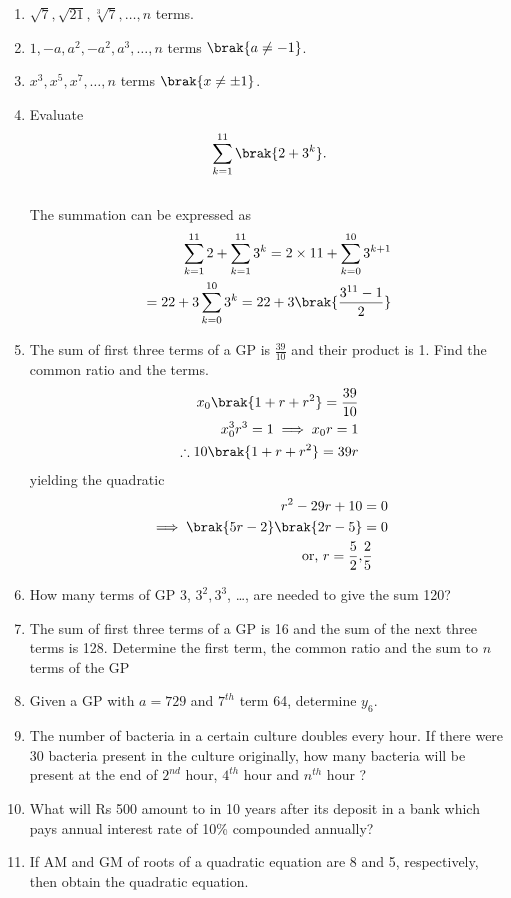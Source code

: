 \begin{enumerate}[label=\thesubsection.\arabic*.,ref=\thesubsection.\theenumi]
\item $\sqrt{7}, \sqrt{21}, \sqrt[3]{7}, \dots,  n$ terms.
\item $1, -a, a^2, -a^2, a^3,\dots,  n$ terms $\brak{a \neq -1}$.
\item $x^3, x^5, x^7,\dots,  n$ terms $\brak{x \neq \pm 1}$.
\item Evaluate $$\sum _{k=1}^{11} \brak{2 + 3^k}.$$
	\\
	\solution  The summation can be expressed as
\begin{align}
\sum _{k=1}^{11} 2 +\sum _{k=1}^{11} 3^k
	=2\times 11 +\sum _{k=0}^{10} 3^{k+1}
	\\
	=22+3\sum _{k=0}^{10} 3^{k}=22+3\brak{\frac{3^{11}-1}{2}}
\end{align}
\item The sum of first three terms of a GP  is $\frac{39}{10}$ and their product is 1. Find the 
common ratio and the terms.
	\\
	\solution
\begin{align}
	x_0\brak{1+r+r^2}=\frac{39}{10}
	\\
	x_0^3r^3=1 \implies x_0r = 1
	\\
	\therefore
	{10}\brak{1+r+r^2}={39}r
\end{align}
yielding the quadratic
\begin{align}
	{10}r^2-29r + 10&=0
	\\
	\implies \brak{5r - 2}\brak{2r-5}&=0
	\\
	\text{or, }
	r = \frac{5}{2},&\frac{2}{5}
\end{align}
\item How many terms of GP  3, $3^2, 3^3$, \dots,  are needed to give the sum 120?
\item The sum of first three terms of a GP  is 16 and the sum of the next three terms is 128. Determine the first term, the common ratio and the sum to $n$ terms of the GP 
\item Given a GP  with $a = 729$ and $7^{th}$ term 64, determine $y_6$.
\item The number of bacteria in a certain culture doubles every hour. If there were 30 bacteria present in the culture originally, how many bacteria will be present at the end of $2^{nd}$ hour, 
$4^{th}$ hour and $n^{th}$ hour ?
\item What will Rs 500 amount to in 10 years after its deposit in a bank which pays annual interest rate of 10\% compounded annually?
\item If AM  and GM  of roots of a quadratic equation are 8 and 5, respectively, then obtain the quadratic equation.

\end{enumerate}
